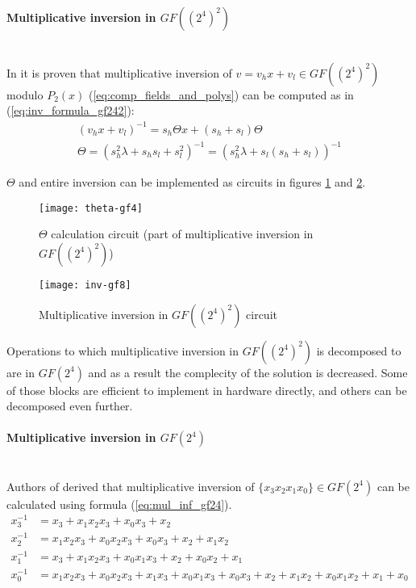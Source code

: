 \paragraph{Multiplicative inversion in $GF((2^4)^2)$}\mbox{}\\
In \cite[Appendix]{vlsi} it is proven that multiplicative inversion of $v = v_hx + v_l \in GF((2^4)^2)$ modulo $P_2(x)$ (\ref{eq:comp_fields_and_polys}) can be computed as in (\ref{eq:inv_formula_gf242}):
\begin{equation}
\begin{gathered}
\label{eq:inv_formula_gf242}
(v_hx + v_l)^{-1} = s_h \Theta x + (s_h + s_l) \Theta\\
\Theta = (s_h^2 \lambda + s_hs_l + s_l^2)^{-1} = (s_h^2 \lambda + s_l (s_h + s_l))^{-1}
\end{gathered}
\end{equation}

$\Theta$ and entire inversion can be implemented as circuits in figures \ref{fig:theta_impl} and \ref{fig:mul_inv_gf242}.

\begin{figure}[!h]
\centering
\texttt{[image: theta-gf4]}
\caption{$\Theta$ calculation circuit (part of multiplicative inversion in $GF((2^4)^2)$)}
\label{fig:theta_impl}
\end{figure}

\begin{figure}[!h]
\centering
\texttt{[image: inv-gf8]}
\caption{Multiplicative inversion in $GF((2^4)^2)$ circuit}
\label{fig:mul_inv_gf242}
\end{figure}

Operations to which multiplicative inversion in $GF((2^4)^2)$ is decomposed to are in $GF(2^4)$ and as a result the complecity of the solution is decreased. Some of those blocks are efficient to implement in hardware directly, and others can be decomposed even further.

\paragraph{Multiplicative inversion in $GF(2^4)$}\mbox{}\\
Authors of \cite{vlsi} derived that multiplicative inversion of $\{x_3x_2x_1x_0\} \in GF(2^4)$ can be calculated using formula (\ref{eq:mul_inf_gf24}).
\begin{equation}
\label{eq:mul_inf_gf24}
\begin{aligned}
x_3^{-1} &= x_3 + x_1x_2x_3 + x_0x_3 + x_2\\
x_2^{-1} &= x_1x_2x_3 + x_0x_2x_3 + x_0x_3 + x_2 + x_1x_2\\
x_1^{-1} &= x_3 + x_1x_2x_3 + x_0x_1x_3 + x_2 + x_0x_2 + x_1\\
x_0^{-1} &= x_1x_2x_3 + x_0x_2x_3 + x_1x_3 + x_0x_1x_3 + x_0x_3 + x_2 + x_1x_2 + x_0x_1x_2 + x_1 + x_0
\end{aligned}
\end{equation}

